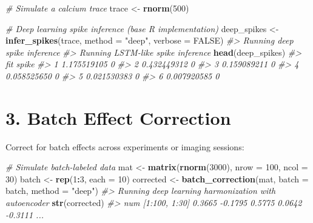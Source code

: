 \documentclass[
]{article}
\newenvironment{Shaded}{\begin{snugshade}}{\end{snugshade}}
\newcommand{\AttributeTok}[1]{\textcolor[rgb]{0.13,0.29,0.53}{#1}}
\newcommand{\CommentTok}[1]{\textcolor[rgb]{0.56,0.35,0.01}{\textit{#1}}}
\newcommand{\ConstantTok}[1]{\textcolor[rgb]{0.56,0.35,0.01}{#1}}
\newcommand{\DecValTok}[1]{\textcolor[rgb]{0.00,0.00,0.81}{#1}}
\newcommand{\FunctionTok}[1]{\textcolor[rgb]{0.13,0.29,0.53}{\textbf{#1}}}
\newcommand{\NormalTok}[1]{#1}
\newcommand{\OtherTok}[1]{\textcolor[rgb]{0.56,0.35,0.01}{#1}}
\newcommand{\SpecialCharTok}[1]{\textcolor[rgb]{0.81,0.36,0.00}{\textbf{#1}}}
\newcommand{\StringTok}[1]{\textcolor[rgb]{0.31,0.60,0.02}{#1}}
\begin{document}
\begin{Shaded}
\begin{Highlighting}[]
\CommentTok{\# Simulate a calcium trace}
\NormalTok{trace }\OtherTok{\textless{}{-}} \FunctionTok{rnorm}\NormalTok{(}\DecValTok{500}\NormalTok{)}

\CommentTok{\# Deep learning spike inference (base R implementation)}
\NormalTok{deep\_spikes }\OtherTok{\textless{}{-}} \FunctionTok{infer\_spikes}\NormalTok{(trace, }\AttributeTok{method =} \StringTok{"deep"}\NormalTok{, }\AttributeTok{verbose =} \ConstantTok{FALSE}\NormalTok{)}
\CommentTok{\#\textgreater{} Running deep spike inference}
\CommentTok{\#\textgreater{} Running LSTM{-}like spike inference}
\FunctionTok{head}\NormalTok{(deep\_spikes)}
\CommentTok{\#\textgreater{}           fit spike}
\CommentTok{\#\textgreater{} 1 1.175519105     0}
\CommentTok{\#\textgreater{} 2 0.432449312     0}
\CommentTok{\#\textgreater{} 3 0.159089211     0}
\CommentTok{\#\textgreater{} 4 0.058525650     0}
\CommentTok{\#\textgreater{} 5 0.021530383     0}
\CommentTok{\#\textgreater{} 6 0.007920585     0}
\end{Highlighting}
\end{Shaded}

\section{3. Batch Effect Correction}\label{batch-effect-correction}

Correct for batch effects across experiments or imaging sessions:

\begin{Shaded}
\begin{Highlighting}[]
\CommentTok{\# Simulate batch{-}labeled data}
\NormalTok{mat }\OtherTok{\textless{}{-}} \FunctionTok{matrix}\NormalTok{(}\FunctionTok{rnorm}\NormalTok{(}\DecValTok{3000}\NormalTok{), }\AttributeTok{nrow =} \DecValTok{100}\NormalTok{, }\AttributeTok{ncol =} \DecValTok{30}\NormalTok{)}
\NormalTok{batch }\OtherTok{\textless{}{-}} \FunctionTok{rep}\NormalTok{(}\DecValTok{1}\SpecialCharTok{:}\DecValTok{3}\NormalTok{, }\AttributeTok{each =} \DecValTok{10}\NormalTok{)}
\NormalTok{corrected }\OtherTok{\textless{}{-}} \FunctionTok{batch\_correction}\NormalTok{(mat, }\AttributeTok{batch =}\NormalTok{ batch, }\AttributeTok{method =} \StringTok{"deep"}\NormalTok{)}
\CommentTok{\#\textgreater{} Running deep learning harmonization with autoencoder}
\FunctionTok{str}\NormalTok{(corrected)}
\CommentTok{\#\textgreater{}  num [1:100, 1:30] 0.3665 {-}0.1795 0.5775 0.0642 {-}0.3111 ...}
\end{Highlighting}
\end{Shaded}
\end{document}

